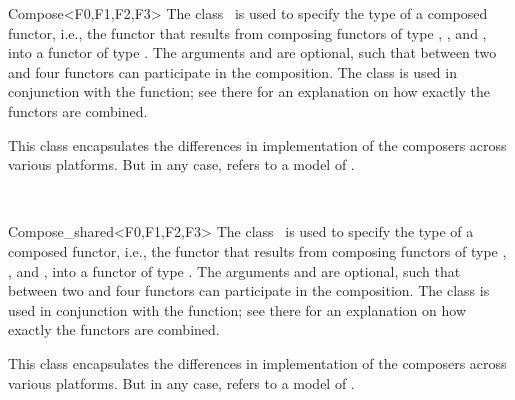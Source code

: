 \begin{ccRefClass}{Compose<F0,F1,F2,F3>}
  \ccDefinition The class \ccRefName\ is used to specify the type of a
  composed functor, i.e., the functor that results from composing
  functors of type , , and , into a functor of
  type . The arguments  and  are optional,
  such that between two and four functors can participate in the
  composition. The class is used in conjunction with the 
  function; see there for an explanation on how exactly the functors
  are combined.

  
  \ccTypes
  
   This class encapsulates the differences in
  implementation of the composers across various platforms. But in any
  case,  refers to a model of .

  \ccSeeAlso
  \\
  
\end{ccRefClass}

\begin{ccRefClass}{Compose_shared<F0,F1,F2,F3>}
  \ccDefinition The class \ccRefName\ is used to specify the type of a
  composed functor, i.e., the functor that results from composing
  functors of type , , and , into a functor of
  type . The arguments  and  are optional,
  such that between two and four functors can participate in the
  composition. The class is used in conjunction with the
   function; see there for an explanation on how
  exactly the functors are combined.

  
  \ccTypes
  
   This class encapsulates the differences in
  implementation of the composers across various platforms. But in any
  case,  refers to a model of .

  \ccSeeAlso
  \\
  
\end{ccRefClass}

